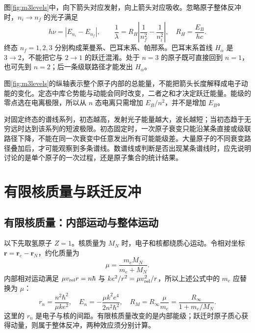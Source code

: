 图\ref{fig:m3levels}中，向下箭头对应发射，向上箭头对应吸收。忽略原子整体反冲时，\(n_i\to n_f\) 的光子满足
\[
 h\nu=|E_{n_i}-E_{n_f}|,\qquad
 \frac1\lambda=R_H\left|\frac1{n_f^2}-\frac1{n_i^2}\right|,
 \quad R_H=\frac{E_B}{hc}.
\]
终态 \(n_f=1,2,3\) 分别构成莱曼系、巴耳末系、帕邢系。巴耳末系首线 \(H_\alpha\) 是 \(3\to2\)，不能把它与 \(2\to1\) 的跃迁混淆。处于 \(n=3\) 的原子既可直接回到 \(n=1\)，也可先到 \(n=2\)；后一条级联路径才能发出 \(H_\alpha\)。

图\ref{fig:m3levels}的纵轴表示整个原子内部的总能量，不能把箭头长度解释成电子动能的变化。定态中库仑势能与动能会同时改变，二者之和才决定跃迁能量。能级的零点选在电离极限，所以从 $n$ 态电离只需增加 $E_B/n^2$，并不是增加 $E_B$。

对固定终态的谱线系列，初态越高，发射光子能量越大，波长越短；当初态趋于无穷远时达到该系列的短波极限。初态固定时，一次原子衰变只能沿某条直接或级联路径下降，不能在同一次衰变中任意发出所有可能能级差。大量原子的不同衰变路径叠加后，才可能观察到多条谱线。数谱线或判断是否出现某条谱线时，应先说明讨论的是单个原子的一次过程，还是原子集合的统计结果。

\section{有限核质量与跃迁反冲}

\subsection{有限核质量：内部运动与整体运动}

以下先取氢原子 $Z=1$。核质量为 $M_N$ 时，电子和核都绕质心运动。令相对坐标 \(\bm r=\bm r_e-\bm r_N\)，约化质量为
\[
 \mu=\frac{m_eM_N}{m_e+M_N}.
\]
内部相对运动满足 \(\mu v_{\rm rel}r=n\hbar\) 与 \(ke^2/r^2=\mu v_{\rm rel}^2/r\)，所以上述公式中的 \(m_e\) 应替换为 \(\mu\)：
\[
 r_n=\frac{n^2\hbar^2}{\mu ke^2},\quad
 E_n=-\frac{\mu k^2e^4}{2n^2\hbar^2},\quad
 \boxed{R_M=R_\infty\frac{\mu}{m_e}=\frac{R_\infty}{1+m_e/M_N}}.
\]
这里的 \(r_n\) 是电子与核的间距。有限核质量改变的是内部能级；跃迁时原子质心获得动量，则属于整体反冲，两种效应须分别计算。

